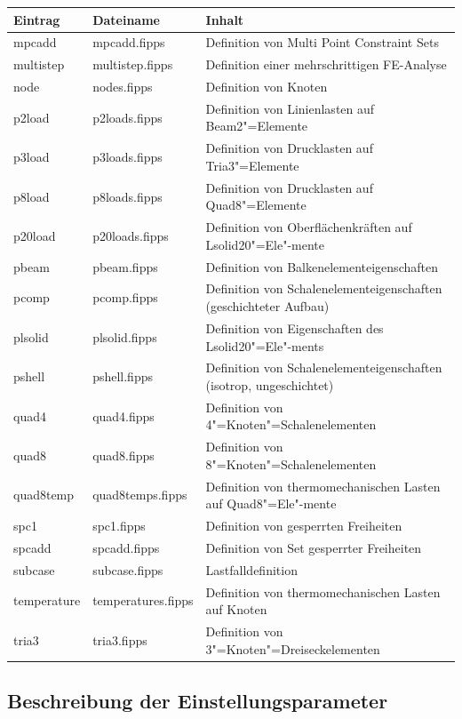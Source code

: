\documentclass[11pt,titlepage,listof=totoc,bibliography=totoc,twoside]{scrreprt}
\begin{document}
{{\newpage

\begin{tabularx}{\textwidth}{llX}
\toprule
Eintrag			& Dateiname			& Inhalt	\\
\midrule
mpcadd			& mpcadd.fipps			& Definition von Multi Point Constraint Sets	\\
multistep		& multistep.fipps		& Definition einer mehrschrittigen FE-Analyse  \\
node			& nodes.fipps			& Definition von Knoten	\\
p2load			& p2loads.fipps			& Definition von Linienlasten auf Beam2"=Elemente	\\
p3load			& p3loads.fipps			& Definition von Drucklasten auf Tria3"=Elemente	\\
p8load			& p8loads.fipps			& Definition von Drucklasten auf Quad8"=Elemente	\\
p20load			& p20loads.fipps		& Definition von Oberflächenkräften auf Lsolid20"=Ele"-mente	\\
pbeam			& pbeam.fipps			& Definition von Balkenelementeigenschaften	\\
pcomp			& pcomp.fipps			& Definition von Schalenelementeigenschaften (geschichteter Aufbau)	\\
plsolid			& plsolid.fipps			& Definition von Eigenschaften des Lsolid20"=Ele"-ments	\\
pshell			& pshell.fipps			& Definition von Schalenelementeigenschaften (isotrop, ungeschichtet)	\\
quad4			& quad4.fipps			& Definition von 4"=Knoten"=Schalenelementen	\\
quad8			& quad8.fipps			& Definition von 8"=Knoten"=Schalenelementen	\\
quad8temp		& quad8temps.fipps		& Definition von thermomechanischen Lasten auf Quad8"=Ele"-mente \\
spc1			& spc1.fipps			& Definition von gesperrten Freiheiten	\\
spcadd			& spcadd.fipps			& Definition von Set gesperrter Freiheiten	\\
subcase			& subcase.fipps			& Lastfalldefinition	\\
temperature		& temperatures.fipps		& Definition von thermomechanischen Lasten auf Knoten \\
tria3			& tria3.fipps			& Definition von 3"=Knoten"=Dreiseckelementen	\\
\bottomrule
\end{tabularx}


\subsection{Beschreibung der Einstellungsparameter}
\label{sec:einstellungsparameter}

}}
\end{document}
